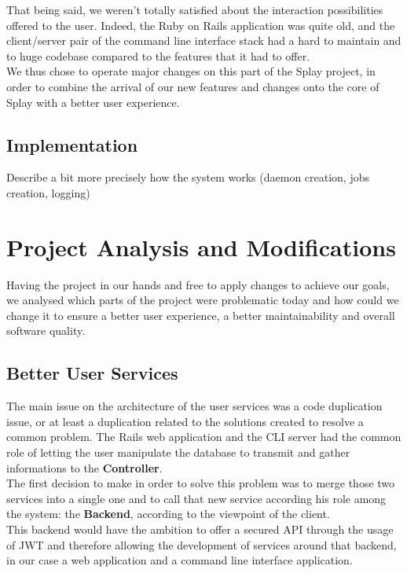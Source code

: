 \documentclass{eplmastersthesis}
\begin{document}
        That being said, we weren't totally satisfied about the interaction
        possibilities offered to the user. Indeed, the Ruby on Rails application
        was quite old, and the client/server pair of the command line interface
        stack had a hard to maintain and to huge codebase compared to the
        features that it had to offer.\\

        We thus chose to operate major changes on this part of the Splay
        project, in order to combine the arrival of our new features and
        changes onto the core of Splay with a better user experience.

      \subsection{Implementation}

        Describe a bit more precisely how the system works (daemon creation,
        jobs creation, logging)

    \section{Project Analysis and Modifications}

      Having the project in our hands and free to apply changes to achieve our
      goals, we analysed which parts of the project were problematic today and
      how could we change it to ensure a better user experience, a better
      maintainability and overall software quality.

      \subsection{Better User Services}

        The main issue on the architecture of the user services was a code
        duplication issue, or at least a duplication related to the solutions
        created to resolve a common problem. The Rails web application and the
        CLI server had the common role of letting the user manipulate the
        database to transmit and gather informations to the \textbf{Controller}.\\

        The first decision to make in order to solve this problem was to
        merge those two services into a single one and to call that new
        service according his role among the system: the \textbf{Backend},
        according to the viewpoint of the client.\\
        This backend would have the ambition to offer a secured API through
        the usage of JWT \cite{JWT} and therefore allowing the development
        of services around that backend, in our case a web application and
        a command line interface application.\\
\end{document}
